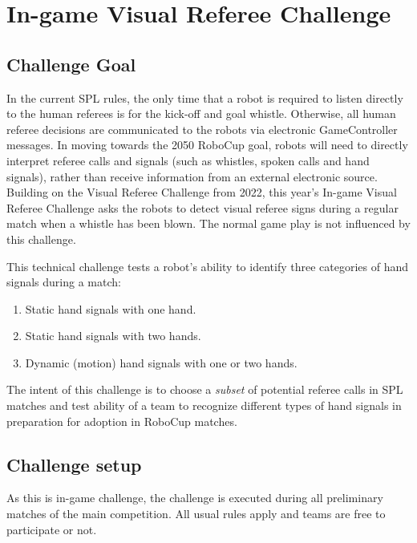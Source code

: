 \section{In-game Visual Referee Challenge}

\subsection{Challenge Goal}

In the current SPL rules, the only time that a robot is required to listen directly to the human referees is for the kick-off and goal whistle. Otherwise, all human referee decisions are communicated to the robots via electronic GameController messages. In moving towards the 2050 RoboCup goal, robots will need to directly interpret referee calls and signals (such as whistles, spoken calls and hand signals), rather than receive information from an external electronic source.
Building on the Visual Referee Challenge from 2022, this year's In-game Visual Referee Challenge asks the robots to detect visual referee signs during a regular match when a whistle has been blown. The normal game play is not influenced by this challenge.

This technical challenge tests a robot's ability to identify three categories of hand signals during a match:
\begin{enumerate}
    \item Static hand signals with one hand.
    \item Static hand signals with two hands.
    \item Dynamic (motion) hand signals with one or two hands.
\end{enumerate}

The intent of this challenge is to choose a \emph{subset} of potential referee calls in SPL matches and test ability of a team to recognize different types of hand signals in preparation for adoption in RoboCup matches.

\subsection{Challenge setup}

As this is in-game challenge, the challenge is executed during all preliminary matches of the main competition. All usual rules apply and teams are free to participate or not.

